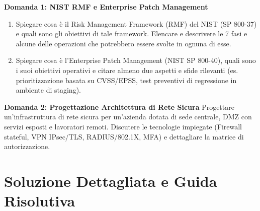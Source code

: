 \documentclass[11pt,a4paper]{article}
\begin{document}
\begin{questionbox}
\textbf{Domanda 1: NIST RMF e Enterprise Patch Management}
\begin{enumerate}[label=\alph*.]
    \item Spiegare cosa \`e il Risk Management Framework (RMF) del NIST (SP 800-37) e quali sono gli obiettivi di tale framework. Elencare e descrivere le 7 fasi e alcune delle operazioni che potrebbero essere svolte in ognuna di esse.
    \item Spiegare cosa \`e l'Enterprise Patch Management (NIST SP 800-40), quali sono i suoi obiettivi operativi e citare almeno due aspetti e sfide rilevanti (es. prioritizzazione basata su CVSS/EPSS, test preventivi di regressione in ambiente di staging).
\end{enumerate}

\textbf{Domanda 2: Progettazione Architettura di Rete Sicura}
Progettare un'infrastruttura di rete sicura per un'azienda dotata di sede centrale, DMZ con servizi esposti e lavoratori remoti. Discutere le tecnologie impiegate (Firewall stateful, VPN IPsec/TLS, RADIUS/802.1X, MFA) e dettagliare la matrice di autorizzazione.
\end{questionbox}

\newpage
\section{Soluzione Dettagliata e Guida Risolutiva}
\end{document}
